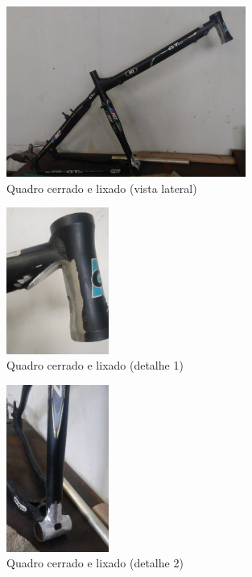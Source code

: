 		
	\begin{figure}[!htb]
		\centering
		\includegraphics[width=0.7\textwidth]{quadro_cerrado_lateral.jpg}
		\caption{Quadro cerrado e lixado (vista lateral)}
		\label{img:quadro_cerrado_lateral}
	\end{figure}
	
	\newpage
	
	\begin{figure}[!htb]
		\centering
		\includegraphics[width=0.3\textwidth]{quadro_cerrado_1.jpg}
		\caption{Quadro cerrado e lixado (detalhe 1)}
		\label{img:quadro_cerrado_1}
	\end{figure}
	
	\begin{figure}[!htb]
		\centering
		\includegraphics[width=0.3\textwidth]{quadro_cerrado_2.jpg}
		\caption{Quadro cerrado e lixado (detalhe 2)}
		\label{img:quadro_cerrado_2}
	\end{figure}
	

